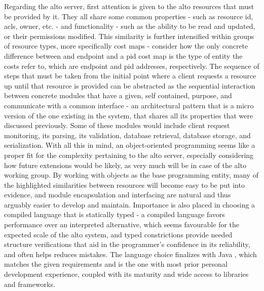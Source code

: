     Regarding the \gls{alto} server, first attention is given to the \gls{alto} resources that must be provided by it.
    They all share some common properties - such as resource id, \glspl{acl}, owner, etc. - and functionality - such as the ability to be read and updated, or their permissions modified.
    This similarity is further intensified within groups of resource types, more specifically cost maps - consider how the only concrete difference between and endpoint and a \gls{pid} cost map is the type of entity the costs refer to, which are endpoint and \gls{pid} addresses, respectively.
    The sequence of steps that must be taken from the initial point where a client requests a resource up until that resource is provided can be abstracted as the sequential interaction between concrete modules that have a given, self contained, purpose, and communicate with a common interface - an architectural pattern that is a micro version of the one existing in the system, that shares all its properties that were discussed previously.
    Some of these modules would include client request monitoring, its parsing, its validation, database retrieval, database storage, and serialization.
    With all this in mind, an object-oriented programming seems like a proper fit for the complexity pertaining to the \gls{alto} server, especially considering how future extensions would be likely, as very much will be in case of the \gls{alto} working group.
    By working with objects as the base programming entity, many of the highlighted similarities between resources will become easy to be put into evidence, and module encapsulation and interfacing are natural and thus arguably easier to develop and maintain.
    Importance is also placed in choosing a compiled language that is statically typed - a compiled language favors performance over an interpreted alternative, which seems favourable for the expected scale of the \gls{alto} system, and typed constrictions provide needed structure verifications that aid in the programmer's confidence in its reliability, and often helps reduces mistakes.
    The language choice finalizes with Java \cite{java}, which matches the given requirements and is the one with most prior personal development experience, coupled with its maturity and wide access to libraries and frameworks.

